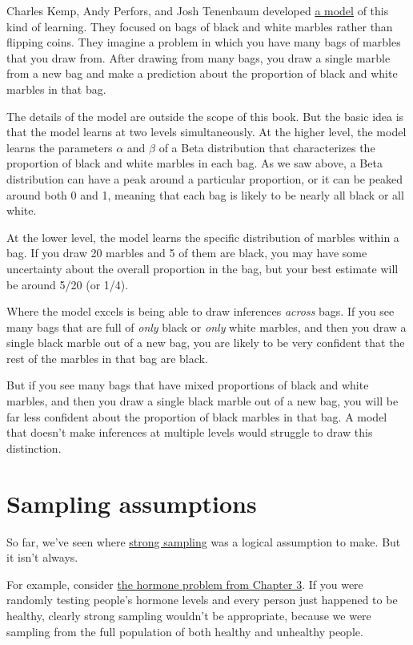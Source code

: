 \documentclass[
  letterpaper,
  DIV=11,
  numbers=noendperiod]{scrreprt}
\begin{document}
Charles Kemp, Andy Perfors, and Josh Tenenbaum developed
\href{http://www.charleskemp.com/papers/KempPTDevSci.pdf}{a model} of
this kind of learning. They focused on bags of black and white marbles
rather than flipping coins. They imagine a problem in which you have
many bags of marbles that you draw from. After drawing from many bags,
you draw a single marble from a new bag and make a prediction about the
proportion of black and white marbles in that bag.

The details of the model are outside the scope of this book. But the
basic idea is that the model learns at two levels simultaneously. At the
higher level, the model learns the parameters \(\alpha\) and \(\beta\)
of a Beta distribution that characterizes the proportion of black and
white marbles in each bag. As we saw above, a Beta distribution can have
a peak around a particular proportion, or it can be peaked around both 0
and 1, meaning that each bag is likely to be nearly all black or all
white.

At the lower level, the model learns the specific distribution of
marbles within a bag. If you draw 20 marbles and 5 of them are black,
you may have some uncertainty about the overall proportion in the bag,
but your best estimate will be around 5/20 (or 1/4).

Where the model excels is being able to draw inferences \emph{across}
bags. If you see many bags that are full of \emph{only} black or
\emph{only} white marbles, and then you draw a single black marble out
of a new bag, you are likely to be very confident that the rest of the
marbles in that bag are black.

But if you see many bags that have mixed proportions of black and white
marbles, and then you draw a single black marble out of a new bag, you
will be far less confident about the proportion of black marbles in that
bag. A model that doesn't make inferences at multiple levels would
struggle to draw this distinction.


\chapter{Sampling assumptions}\label{sampling-assumptions}

So far, we've seen where \hyperref[weak-strong-sampling]{strong
sampling} was a logical assumption to make. But it isn't always.

For example, consider \hyperref[hormones]{the hormone problem from
Chapter 3}. If you were randomly testing people's hormone levels and
every person just happened to be healthy, clearly strong sampling
wouldn't be appropriate, because we were sampling from the full
population of both healthy and unhealthy people.
\end{document}
